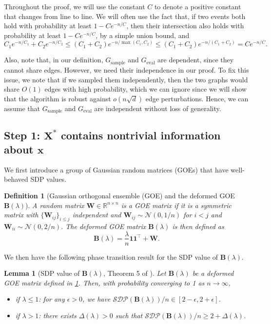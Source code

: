 \documentclass[11pt, titlepage]{article} %
\numberwithin{equation}{section}
\newtheorem{lemma}{Lemma}
\newtheorem{definition}{Definition}
\theoremstyle{definition}
\numberwithin{theorem}{section}
\numberwithin{lemma}{section}
\numberwithin{corollary}{section}
\numberwithin{proposition}{section}
\numberwithin{definition}{section}
\numberwithin{remark}{section}
\begin{document}
Throughout the proof, we will use the constant $C$ to denote a positive constant that changes 
from line to line. We will often use the fact that, if two events both hold with probability 
at least $1 - Ce^{-n/C}$, then their intersection also holds with probability at least $1 - Ce^{-n/C}$, 
by a simple union bound, and
\[
C_1 e^{-n/C_1} + C_2 e^{-n/C_2} \leq (C_1 + C_2) e^{-n/\max(C_1, C_2)} 
\leq (C_1 + C_2) e^{-n/(C_1 + C_2)} = C e^{-n/C}.
\]

Also, note that, in our definition, $G_\mathrm{sample}$ and $G_\mathrm{eval}$ are dependent, since
they cannot share edges. However, we need their independence in our proof. To fix this issue, we note
that if we sampled them independently, then the two graphs would share $O(1)$ edges with high probability,
which we can ignore since we will show that the algorithm is robust against $o(n\sqrt{d})$ edge perturbations.
Hence, we can assume that $G_\mathrm{sample}$ and $G_\mathrm{eval}$ are independent without loss of generality.

\subsection{Step 1: $\bm{X}^*$ contains nontrivial information about $\bm{x}$}
We first introduce a group of Gaussian random matrices (GOEs) that have well-behaved SDP values.
\begin{definition}[Gaussian orthogonal ensemble (GOE) and the deformed GOE $\bm{B}(\lambda)$]
\label{def:GOE}
A random matrix $\bm{W} \in \mathbb{R}^{n \times n}$ is a \emph{GOE matrix} 
if it is a symmetric matrix with $\{\bm{W}_{ij}\}_{i \leq j}$ independent
and $\bm{W}_{ij} \sim \mathcal{N}(0, 1/n)$ for $i < j$ and $\bm{W}_{ii} \sim \mathcal{N}(0, 2/n)$. 
The \emph{deformed GOE matrix} $\bm{B}(\lambda)$ is then defined as \[\bm{B}(\lambda) = \frac{\lambda}{n} \bm{1}\bm{1}^\top + \bm{W}.\]
\end{definition}

We then have the following phase transition result for the SDP value of $\bm{B}(\lambda)$.
\begin{lemma}[SDP value of $\bm{B}(\lambda)$, Theorem 5 of \cite{MS16}]
\label{lem:GOE.SDP}
Let $\bm{B}(\lambda)$ be a deformed GOE matrix defined in \cref{def:GOE}. Then, with probability converging to 1 as $n \to \infty$,
\begin{itemize}
\item[(a)] if $\lambda \leq 1$: for any $\epsilon > 0$, we have 
$\mathcal{SDP}(\bm{B}(\lambda)) / n \in [2 - \epsilon, 2 + \epsilon]$.
\item[(b)] if $\lambda > 1$: there exists $\Delta(\lambda) > 0$ such that 
$\mathcal{SDP}(\bm{B}(\lambda)) / n \geq 2 + \Delta(\lambda)$.
\end{itemize}
\end{lemma}
\end{document}

